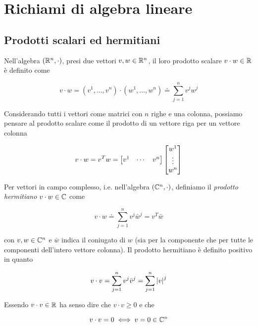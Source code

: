 \section{Richiami di algebra lineare}

\subsection{Prodotti scalari ed hermitiani}

Nell'algebra $ (\mathbb{R}^{n},\cdot) $, presi due vettori $ v,w \in \mathbb{R}^{n} $, il loro prodotto scalare $ v \cdot w \in \mathbb{R} $ è definito come

\begin{equation}
	v \cdot w = (v^{1},\dots,v^{n}) \cdot (w^{1},\dots,w^{n}) \doteq \sum_{j=1}^{n} v^{j} w^{j}
\end{equation}

Considerando tutti i vettori come matrici con $ n $ righe e una colonna, possiamo pensare al prodotto scalare come il prodotto di un vettore riga per un vettore colonna

\begin{equation}
	v \cdot w = v^{T} w = %
	\bmqty{ v^{1} & \cdots & v^{n} } \bmqty{ w^{1} \\ \vdots \\ w^{n} }
\end{equation}

Per vettori in campo complesso, i.e. nell'algebra $ (\mathbb{C}^{n},\cdot) $, definiamo il \textit{prodotto hermitiano} $ v \cdot w \in \mathbb{C} $ come

\begin{equation}
	v \cdot w \doteq \sum_{j=1}^{n} v^{j} \bar{w}^{j} = v^{T} \bar{w}
\end{equation}

con $ v,w \in \mathbb{C}^{n} $ e $ \bar{w} $ indica il coniugato di $ w $ (sia per la componente che per tutte le componenti dell'intero vettore colonna). Il prodotto hermitiano è definito positivo in quanto

\begin{equation}
	v \cdot v = \sum_{j=1}^{n} v^{j} \bar{v}^{j} = \sum_{j=1}^{n} \abs{v}^{j}
\end{equation}

Essendo $ v \cdot v \in \mathbb{R} $ ha senso dire che $ v \cdot v \geqslant 0 $ e che

\begin{equation}
	v \cdot v = 0 \iff v = 0 \in \mathbb{C}^{n}
\end{equation}

